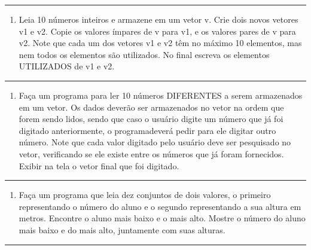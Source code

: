 \documentclass[12pt,a4paper]{article}
\providecommand{\tightlist}{%
      \setlength{\itemsep}{0pt}\setlength{\parskip}{0pt}}
\begin{document}
    \begin{center}\rule{0.5\linewidth}{0.5pt}\end{center}

\begin{enumerate}
\def\labelenumi{\arabic{enumi}.}
\setcounter{enumi}{26}
\tightlist
\item
  Leia 10 números inteiros e armazene em um vetor v. Crie dois novos
  vetores v1 e v2. Copie os valores ímpares de v para v1, e os valores
  pares de v para v2. Note que cada um dos vetores v1 e v2 têm no máximo
  10 elementos, mas nem todos os elementos são utilizados. No final
  escreva os elementos UTILIZADOS de v1 e v2.
\end{enumerate}

    \begin{center}\rule{0.5\linewidth}{0.5pt}\end{center}

\begin{enumerate}
\def\labelenumi{\arabic{enumi}.}
\setcounter{enumi}{27}
\tightlist
\item
  Faça um programa para ler 10 números DIFERENTES a serem armazenados em
  um vetor. Os dados deverão ser armazenados no vetor na ordem que forem
  sendo lidos, sendo que caso o usuário digite um número que já foi
  digitado anteriormente, o programadeverá pedir para ele digitar outro
  número. Note que cada valor digitado pelo usuário deve ser pesquisado
  no vetor, verificando se ele existe entre os números que já foram
  fornecidos. Exibir na tela o vetor final que foi digitado.
\end{enumerate}

    \begin{center}\rule{0.5\linewidth}{0.5pt}\end{center}

\begin{enumerate}
\def\labelenumi{\arabic{enumi}.}
\setcounter{enumi}{28}
\tightlist
\item
  Faça um programa que leia dez conjuntos de dois valores, o primeiro
  representando o número do aluno e o segundo representando a sua altura
  em metros. Encontre o aluno mais baixo e o mais alto. Mostre o número
  do aluno mais baixo e do mais alto, juntamente com suas alturas.
\end{enumerate}

    \begin{center}\rule{0.5\linewidth}{0.5pt}\end{center}
\end{document}

